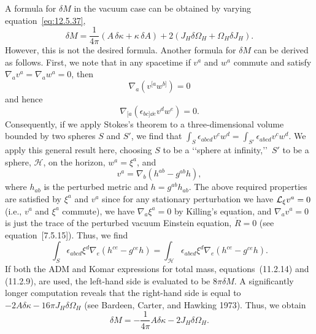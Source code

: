 A formula for \(\delta M\) in the vacuum case can be obtained by varying
equation~\eqref{eq:12.5.37},
\begin{equation}
 \delta M=\frac1{4\pi}(A\,\delta\kappa+\kappa\,\delta A)
 +2(J_H\delta\Omega_H+\Omega_H\delta J_H) .
 \tag{12.5.38}\label{eq:12.5.38}
\end{equation}
However, this is not the desired formula. Another formula for \(\delta M\) can be
derived as follows. First, we note that in any spacetime if \(v^a\) and \(w^a\)
commute and satisfy \(\nabla_av^a=\nabla_aw^a=0\), then
\begin{equation}
 \nabla_a(v^{[a}w^{b]})=0
 \tag{12.5.39}\label{eq:12.5.39}
\end{equation}
and hence
\begin{equation}
 \nabla_{[a}(\epsilon_{bc]\dd e}v^dw^e)=0 .
 \tag{12.5.40}\label{eq:12.5.40}
\end{equation}
Consequently, if we apply Stokes's theorem to a three-dimensional volume bounded
by two spheres \(S\) and \(S'\), we find that
\(\int_S\epsilon_{abcd}v^cw^d=\int_{S'}\epsilon_{abcd}v^cw^d\). We apply this
general result here, choosing \(S\) to be a \lq\lq sphere at infinity,\rq\rq\ \(S'\) to be a
sphere, \(\mathcal H\), on the horizon, \(w^a=\xi^a\), and
\begin{equation}
 v^a=\nabla_b(h^{ab}-g^{ab}h) ,
 \tag{12.5.41}\label{eq:12.5.41}
\end{equation}
where \(h_{ab}\) is the perturbed metric and \(h=g^{ab}h_{ab}\). The above
required properties are satisfied by \(\xi^a\) and \(v^a\) since for any stationary
perturbation we have \(\mathcal{L}_\xi v^a=0\) (i.e., \(v^a\) and \(\xi^a\) commute), we
have \(\nabla_a\xi^a=0\) by Killing's equation, and \(\nabla_av^a=0\) is just the
trace of the perturbed vacuum Einstein equation, \(\dot R=0\) (see equation~[7.5.15]).
Thus, we find
\begin{equation}
 \int_S\epsilon_{abcd}\xi^d\nabla_e(h^{ce}-g^{ce}h)
 =\int_{\mathcal H}\epsilon_{abcd}\xi^d\nabla_e(h^{ce}-g^{ce}h) .
 \tag{12.5.42}\label{eq:12.5.42}
\end{equation}
If both the ADM and Komar expressions for total mass, equations~(11.2.14) and
(11.2.9), are used, the left-hand side is evaluated to be \(8\pi\delta M\). A
significantly longer computation reveals that the right-hand side is equal to
\(-2A\delta\kappa-16\pi J_H\delta\Omega_H\) (see Bardeen, Carter, and Hawking
1973). Thus, we obtain
\begin{equation}
 \delta M=-\frac1{4\pi}A\delta\kappa-2J_H\delta\Omega_H .
 \tag{12.5.43}\label{eq:12.5.43}
\end{equation}
